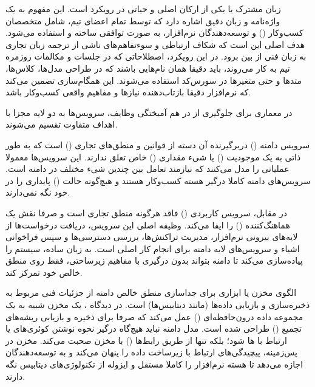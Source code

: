 
زبان مشترک یا  یکی از ارکان اصلی و حیاتی در رویکرد  است. این مفهوم به یک واژه‌نامه و زبان دقیق اشاره دارد که توسط تمام اعضای تیم، شامل متخصصان کسب‌وکار () و توسعه‌دهندگان نرم‌افزار، به صورت توافقی ساخته و استفاده می‌شود. هدف اصلی این است که شکاف ارتباطی و سوءتفاهم‌های ناشی از ترجمه زبان تجاری به زبان فنی از بین برود. در این رویکرد، اصطلاحاتی که در جلسات و مکالمات روزمره تیم به کار می‌روند، باید دقیقا همان نام‌هایی باشند که در طراحی مدل‌ها، کلاس‌ها، متدها و حتی متغیرها در سورس‌کد استفاده می‌شوند. این همگام‌سازی تضمین می‌کند که نرم‌افزار دقیقا بازتاب‌دهنده نیازها و مفاهیم واقعی کسب‌وکار باشد.


در معماری  برای جلوگیری از در هم آمیختگی وظایف، سرویس‌ها به دو لایه مجزا با اهداف متفاوت تقسیم می‌شوند.

سرویس دامنه () دربرگیرنده آن دسته از قوانین و منطق‌های تجاری () است که به طور ذاتی به یک موجودیت () یا شیء مقداری () خاص تعلق ندارند. این سرویس‌ها معمولا عملیاتی را مدل می‌کنند که نیازمند تعامل بین چندین شیء مختلف در دامنه است. سرویس‌های دامنه کاملا درگیر هسته کسب‌وکار هستند و هیچ‌گونه حالت () پایداری را در خود نگه نمی‌دارند.

در مقابل، سرویس کاربردی () فاقد هرگونه منطق تجاری است و صرفا نقش یک هماهنگ‌کننده () را ایفا می‌کند. وظیفه اصلی این سرویس، دریافت درخواست‌ها از لایه‌های بیرونی نرم‌افزار، مدیریت تراکنش‌ها، بررسی دسترسی‌ها و سپس فراخوانی اشیاء و سرویس‌های لایه دامنه برای انجام کار اصلی است. به زبان ساده،  سیستم را پیاده‌سازی می‌کند تا دامنه بتواند بدون درگیری با مفاهیم زیرساختی، فقط روی منطق خالص خود تمرکز کند.


الگوی مخزن یا  ابزاری برای جداسازی منطق خالص دامنه از جزئیات فنی مربوط به ذخیره‌سازی و بازیابی داده‌ها (مانند دیتابیس‌ها) است. در دیدگاه ، یک مخزن شبیه به یک مجموعه داده درون‌حافظه‌ای () عمل می‌کند که صرفا برای ذخیره و بازیابی ریشه‌های تجمیع () طراحی شده است. مدل دامنه نباید هیچ‌گاه درگیر نحوه نوشتن کوئری‌های  یا ارتباط با ها شود؛ بلکه تنها از طریق رابط‌ها () با مخزن صحبت می‌کند. مخزن در پس‌زمینه، پیچیدگی‌های ارتباط با زیرساخت داده را پنهان می‌کند و به توسعه‌دهندگان اجازه می‌دهد تا هسته نرم‌افزار را کاملا مستقل و ایزوله از تکنولوژی‌های دیتابیس نگه دارند.